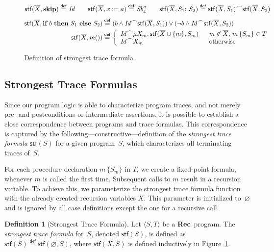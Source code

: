 \documentclass[10pt,a4paper]{amsart}
\theoremstyle{definition}
\newtheorem{definition}[theorem]{Definition}
\newcommand{\defeq}{\stackrel{\mathsf{def}}{=}}
\newcommand{\chop}[0]{\raisebox{1ex}{$\frown$}}
\newcommand{\stfs}[1]{\mathsf{stf} (#1)}
\newcommand{\stfh}[2]{\mathsf{stf}(#1, #2)}
\newcommand{\Rec}{\mbox{\bf Rec}}
\newcommand{\Skip}{\mbox{\bf skip}}
\newcommand{\If}{\mbox{\bf if}}
\newcommand{\Then}{\mbox{\bf then}}
\newcommand{\Else}{\mbox{\bf else}}
\begin{document}

\begin{figure}%
  \centering
    $\stfh{\overline{X}}{\Skip}  \defeq \mathit{Id} \qquad
    \stfh{\overline{X}}{x := a}  \defeq \mathit{Sb}^{a}_x \qquad
    \stfh{\overline{X}}{S_1;\,S_2}  \defeq \stfh{\overline{X}}{S_1} \chop \stfh{\overline{X}}{S_2}
    $
    \begin{align*}
    \stfh{\overline{X}}{\If\ b\ \Then\ S_1\ \Else\ S_2} & \defeq 
       (b \land \mathit{Id} \chop \stfh{\overline{X}}{S_1})
       \lor
       (\lnot b \land \mathit{Id} \chop \stfh{\overline{X}}{S_2}) \\
  \stfh{\overline{X}}{m()} & \defeq 
  \left\{
    \begin{array}{l@{\quad}l}
    \mathit{Id} \chop \mu X_m.\, \stfh{\overline{X}\cup\{m\}}{S_m} & 
    ~~m\not\in\overline{X},\,m\,\{{S_m}\}\in T \\
    \mathit{Id} \chop X_m & ~~\text{otherwise}
    \end{array}
          \right.
  \end{align*}
\caption{\label{fig:stf}Definition of strongest trace formula.}
\end{figure}


\subsection{Strongest Trace Formulas} 
\label{sec:stf}

Since our program logic is able to characterize program traces, and not
merely pre- and postconditions or intermediate assertions, it is
possible to establish a close correspondence between programs and
trace formulas.
%
This correspondence is captured by the
following---constructive---definition of the \emph{strongest trace
formula} $\stfs{S}$ for a given program~$S$, which characterizes all
terminating traces of~$S$.

For each procedure declaration $m\,\{S_m\}$ in $T$, we create a
fixed-point formula, whenever $m$ is called the first time. Subsequent
calls to $m$ result in a recursion variable. To achieve this, we
parameterize the strongest trace formula function with the already
created recursion variables $\overline{X}$. This parameter is
initialized to~$\varnothing$ and is ignored by all case definitions
except the one for a recursive call.

\begin{definition}[Strongest Trace Formula]
\label{def:stf}
  Let $\langle S,T\rangle$ be a \Rec\ program.
  The \emph{strongest trace formula} for~$S$, denoted
  $\stfs{S}$, is defined as $\stfs{S}\defeq\stfh{\varnothing}{S}$, where
  $\stfh{X}{S}$ is defined inductively in Figure~\ref{fig:stf}.
\end{definition}
\end{document}
